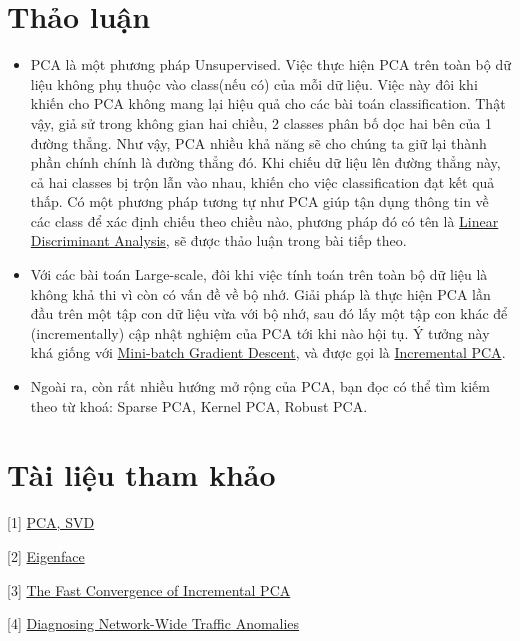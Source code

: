 \section{Thảo luận}
\begin{itemize}
\item PCA là một phương pháp Unsupervised. Việc thực hiện PCA trên toàn bộ dữ liệu không phụ thuộc vào class(nếu có) của mỗi dữ liệu. Việc này đôi khi khiến cho PCA không mang lại hiệu quả cho các bài toán classification. Thật vậy, giả sử trong không gian hai chiều, 2 classes phân bố dọc hai bên của 1 đường thẳng. Như vậy, PCA nhiều khả năng sẽ cho chúng ta giữ lại thành phần chính chính là đường thẳng đó. Khi chiếu dữ liệu lên đường thẳng này, cả hai classes bị trộn lẫn vào nhau, khiến cho việc classification đạt kết quả thấp. Có một phương pháp tương tự như PCA giúp tận dụng thông tin về các class để xác định chiếu theo chiều nào, phương pháp đó có tên là \href{https://en.wikipedia.org/wiki/Linear_discriminant_analysis}{Linear Discriminant Analysis}, sẽ được thảo luận trong bài tiếp theo. 
 
\item Với các bài toán Large-scale, đôi khi việc tính toán trên toàn bộ dữ liệu là không khả thi vì còn có vấn đề về bộ nhớ. Giải pháp là thực hiện PCA lần đầu trên một tập con dữ liệu vừa với bộ nhớ, sau đó lấy một tập con khác để (incrementally) cập nhật nghiệm của PCA tới khi nào hội tụ. Ý tưởng này khá giống với \href{http://machinelearningcoban.com/2017/01/16/gradientdescent2/#-mini-batch-gradient-descent}{Mini-batch Gradient Descent}, và được gọi là \href{http://cseweb.ucsd.edu/~dasgupta/papers/incremental-pca.pdf}{Incremental PCA}. 
 
\item Ngoài ra, còn rất nhiều hướng mở rộng của PCA, bạn đọc có thể tìm kiếm theo từ khoá: Sparse PCA, Kernel PCA, Robust PCA. 
\end{itemize}
 
 
\section{Tài liệu tham khảo}
[1] \href{https://www.youtube.com/watch?v=F-nfsSq42ow}{PCA, SVD} 
 
[2] \href{https://en.wikipedia.org/wiki/Eigenface}{Eigenface} 
 
[3] \href{http://cseweb.ucsd.edu/~dasgupta/papers/incremental-pca.pdf}{The Fast Convergence of Incremental PCA} 
 
[4] \href{http://www.cs.bu.edu/fac/crovella/paper-archive/sigc04-network-wide-anomalies.pdf}{Diagnosing Network-Wide Traffic  Anomalies} 
 
